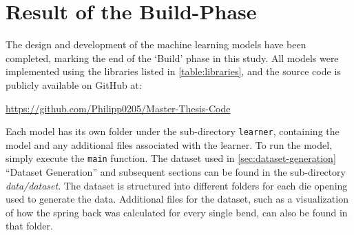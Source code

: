 \section{Result of the Build-Phase}\label{sec:results-build-phase}

The design and development of the machine learning models have been completed, marking the end of the `Build' phase
in this study.
All models were implemented using the libraries listed in \cref{table:libraries}, and the source
code is publicly available on GitHub at:

\url{https://github.com/Philipp0205/Master-Thesis-Code}

Each model has its own folder under the sub-directory \texttt{learner}, containing the model and any additional files
associated with the learner.
To run the model, simply execute the \texttt{main} function.
The dataset used in \cref{sec:dataset-generation} ``Dataset Generation'' and subsequent sections can be found in
the sub-directory \textit{data/dataset}.
The dataset is structured into different folders for each die opening used
to generate the data.
Additional files for the dataset, such as a visualization of how the spring back was calculated
for every single bend, can also be found in that folder.
